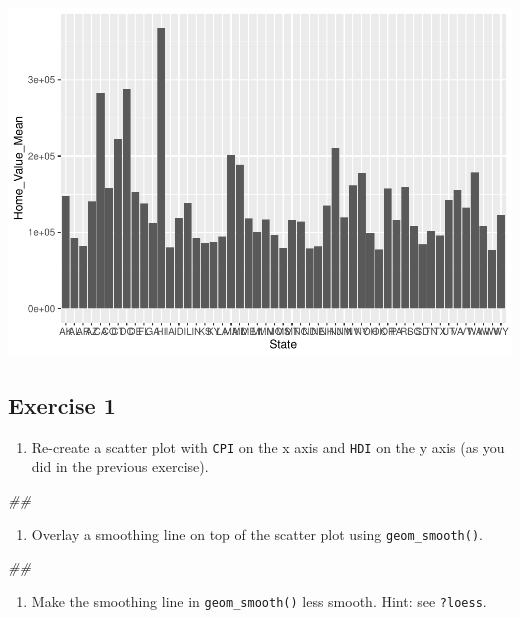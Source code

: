 \documentclass[
]{book}
\newenvironment{Shaded}{\begin{snugshade}}{\end{snugshade}}
\newcommand{\CommentTok}[1]{\textcolor[rgb]{0.56,0.35,0.01}{\textit{#1}}}
\providecommand{\tightlist}{%
  \setlength{\itemsep}{0pt}\setlength{\parskip}{0pt}}
\begin{document}
\includegraphics{R/Rgraphics/figures/unnamed-chunk-169-1.pdf}

\hypertarget{exercise-1-2}{%
\subsection{Exercise 1}\label{exercise-1-2}}

\begin{enumerate}
\def\labelenumi{\arabic{enumi}.}
\tightlist
\item
  Re-create a scatter plot with \texttt{CPI} on the x axis and \texttt{HDI} on the y axis (as you did in the previous exercise).
\end{enumerate}

\begin{Shaded}
\begin{Highlighting}[]
\CommentTok{\#\# }
\end{Highlighting}
\end{Shaded}

\begin{enumerate}
\def\labelenumi{\arabic{enumi}.}
\setcounter{enumi}{1}
\tightlist
\item
  Overlay a smoothing line on top of the scatter plot using \texttt{geom\_smooth()}.
\end{enumerate}

\begin{Shaded}
\begin{Highlighting}[]
\CommentTok{\#\# }
\end{Highlighting}
\end{Shaded}

\begin{enumerate}
\def\labelenumi{\arabic{enumi}.}
\setcounter{enumi}{2}
\tightlist
\item
  Make the smoothing line in \texttt{geom\_smooth()} less smooth. Hint: see \texttt{?loess}.
\end{enumerate}
\end{document}
